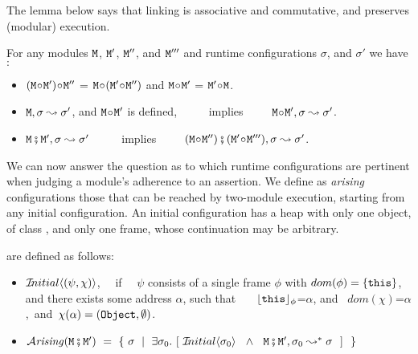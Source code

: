 
The lemma below says  that linking is associative and commutative, and preserves (modular) execution.

\begin{lemma}
 For any modules $\M$,   $\M'$, $\M''$, and $\M'''$ and runtime configurations $\sigma$, and $\sigma'$ we have$:$
 \label{lemma:linking:properties}

 \begin{itemize}
     \item
     $(\M \link \M')\link \M''$ = $\M \link (\M' \link \M'')$  \hspace{1cm} and    \hspace{1cm}   $\M \link \M'$  = $\M' \link\M$.
      \item
      $\M, \sigma \leadsto \sigma'$, and $\M\link \M'$ is defined, \  \ \ \ \  implies\ \ \ \ \   $\M\link \M', \sigma \leadsto \sigma'$.
 \item
 $\M \mkpair \M', \sigma \leadsto \sigma'$   \  \ \ \ \  implies\ \ \ \ \  $(\M\link\M'') \mkpair (\M'\link\M''') ,\sigma \leadsto \sigma'$.  
  \end{itemize}

 \end{lemma}
 
 We can now answer the question as to which runtime configurations are pertinent when judging a module's
adherence to an assertion.
We define as  {\em arising} configurations those that can be reached by two-module execution, starting from any initial configuration.
An initial configuration has a heap with only one object, of class , and only one frame, whose continuation may be arbitrary.
 
\begin{definition} are defined as follows: \label{defn:iniial-and-arising}

\begin{itemize}
     \item
   $\Initial {(\psi,\chi)}$, \ \ if \ \ $\psi$ consists of a single frame $\phi$ with $dom(\phi)=\{ \this \}$, and there exists  some address $\alpha$, such that \ \ \    $\interp {\this}{\phi}$=$\alpha$, and \ $dom(\chi)$=$\alpha$,\  and\  
    $\chi(\alpha)=(\prg{Object},\emptyset)$.
 \item
 $\Arising  {\M\mkpair\M'} \ = \ \{ \ \sigma \ \mid \ \exists \sigma_0. \ [\  \Initial{\sigma_0} \  \ \wedge\ \  \M\mkpair\M', \sigma_0 \leadsto^* \sigma \ \ ] \ \ \} $
 \end{itemize}

\end{definition}

